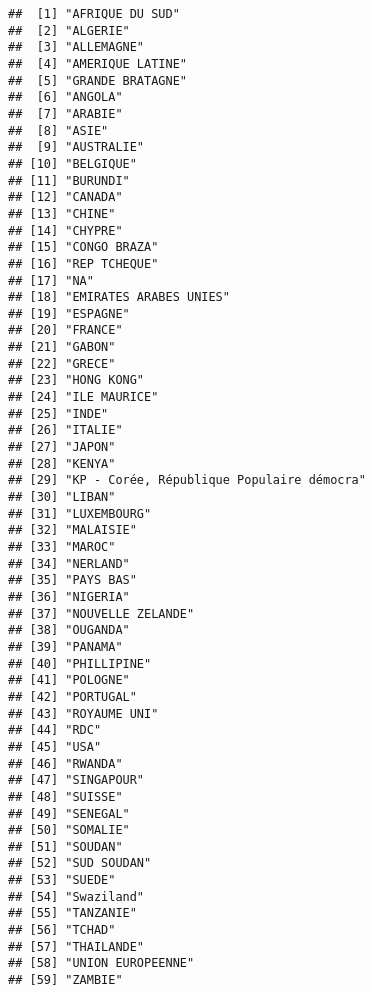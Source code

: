 \documentclass[
]{book}
\begin{document}
\begin{verbatim}
##  [1] "AFRIQUE DU SUD"                          
##  [2] "ALGERIE"                                 
##  [3] "ALLEMAGNE"                               
##  [4] "AMERIQUE LATINE"                         
##  [5] "GRANDE BRATAGNE"                         
##  [6] "ANGOLA"                                  
##  [7] "ARABIE"                                  
##  [8] "ASIE"                                    
##  [9] "AUSTRALIE"                               
## [10] "BELGIQUE"                                
## [11] "BURUNDI"                                 
## [12] "CANADA"                                  
## [13] "CHINE"                                   
## [14] "CHYPRE"                                  
## [15] "CONGO BRAZA"                             
## [16] "REP TCHEQUE"                             
## [17] "NA"                                      
## [18] "EMIRATES ARABES UNIES"                   
## [19] "ESPAGNE"                                 
## [20] "FRANCE"                                  
## [21] "GABON"                                   
## [22] "GRECE"                                   
## [23] "HONG KONG"                               
## [24] "ILE MAURICE"                             
## [25] "INDE"                                    
## [26] "ITALIE"                                  
## [27] "JAPON"                                   
## [28] "KENYA"                                   
## [29] "KP - Corée, République Populaire démocra"
## [30] "LIBAN"                                   
## [31] "LUXEMBOURG"                              
## [32] "MALAISIE"                                
## [33] "MAROC"                                   
## [34] "NERLAND"                                 
## [35] "PAYS BAS"                                
## [36] "NIGERIA"                                 
## [37] "NOUVELLE ZELANDE"                        
## [38] "OUGANDA"                                 
## [39] "PANAMA"                                  
## [40] "PHILLIPINE"                              
## [41] "POLOGNE"                                 
## [42] "PORTUGAL"                                
## [43] "ROYAUME UNI"                             
## [44] "RDC"                                     
## [45] "USA"                                     
## [46] "RWANDA"                                  
## [47] "SINGAPOUR"                               
## [48] "SUISSE"                                  
## [49] "SENEGAL"                                 
## [50] "SOMALIE"                                 
## [51] "SOUDAN"                                  
## [52] "SUD SOUDAN"                              
## [53] "SUEDE"                                   
## [54] "Swaziland"                               
## [55] "TANZANIE"                                
## [56] "TCHAD"                                   
## [57] "THAILANDE"                               
## [58] "UNION EUROPEENNE"                        
## [59] "ZAMBIE"
\end{verbatim}
\end{document}

